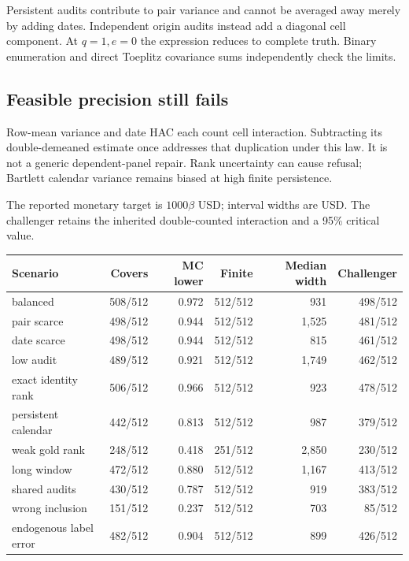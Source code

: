 Persistent audits contribute to pair variance and cannot be averaged away merely by adding dates. Independent origin audits instead add a diagonal cell component. At $q=1,e=0$ the expression reduces to complete truth. Binary enumeration and direct Toeplitz covariance sums independently check the limits.

\subsection{Feasible precision still fails}
Row-mean variance and date HAC each count cell interaction. Subtracting its double-demeaned estimate once addresses that duplication under this law. It is not a generic dependent-panel repair. Rank uncertainty can cause refusal; Bartlett calendar variance remains biased at high finite persistence.

The reported monetary target is $1000\beta$ USD; interval widths are USD. The challenger retains the inherited double-counted interaction and a 95\% critical value.

\begin{center}\footnotesize\begin{tabular}{lrrrrr}\toprule
Scenario & Covers & MC lower & Finite & Median width & Challenger\\
\midrule
balanced & 508/512 & 0.972 & 512/512 & 931 & 498/512 \\
pair scarce & 498/512 & 0.944 & 512/512 & 1,525 & 481/512 \\
date scarce & 498/512 & 0.944 & 512/512 & 815 & 461/512 \\
low audit & 489/512 & 0.921 & 512/512 & 1,749 & 462/512 \\
exact identity rank & 506/512 & 0.966 & 512/512 & 923 & 478/512 \\
persistent calendar & 442/512 & 0.813 & 512/512 & 987 & 379/512 \\
weak gold rank & 248/512 & 0.418 & 251/512 & 2,850 & 230/512 \\
long window & 472/512 & 0.880 & 512/512 & 1,167 & 413/512 \\
shared audits & 430/512 & 0.787 & 512/512 & 919 & 383/512 \\
wrong inclusion & 151/512 & 0.237 & 512/512 & 703 & 85/512 \\
endogenous label error & 482/512 & 0.904 & 512/512 & 899 & 426/512 \\
\bottomrule\end{tabular}\end{center}


